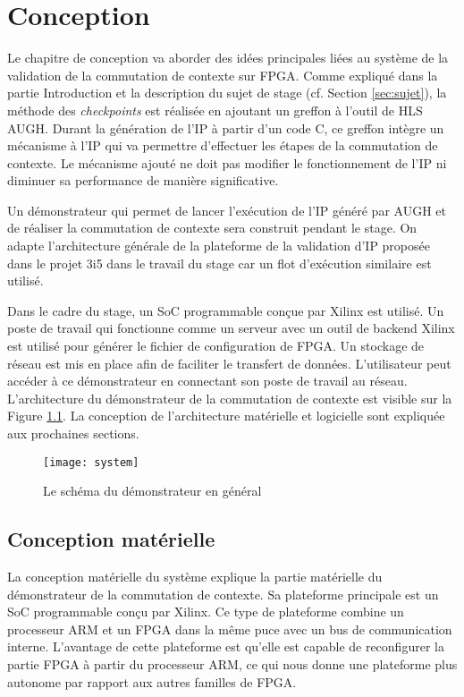\chapter{Conception}
\label{chap:concep}
\OnehalfSpacing

Le chapitre de conception va aborder des idées principales liées au système de la validation de la commutation de contexte sur FPGA.
Comme expliqué dans la partie Introduction et la description du sujet de stage 
(cf. Section \ref{sec:sujet}), la méthode des \emph{checkpoints} 
est réalisée en ajoutant un greffon à l'outil de HLS AUGH.
Durant la génération de l'IP à partir d'un code C, ce greffon intègre un mécanisme à l'IP
qui va permettre d'effectuer les étapes de la commutation de contexte. Le mécanisme
ajouté ne doit pas modifier le fonctionnement de l'IP ni diminuer sa performance de manière significative.

Un démonstrateur qui permet de lancer l'exécution de l'IP généré par AUGH et de réaliser la commutation
de contexte sera construit pendant le stage.
On adapte l'architecture générale de la plateforme de la validation d'IP
proposée dans le projet 3i5\cite{Brisebard2015, Wicaksana2015} dans le travail du stage car
un flot d'exécution similaire est utilisé. 

Dans le cadre du stage, un SoC programmable conçue par Xilinx est utilisé.
Un poste de travail qui fonctionne comme un serveur avec un outil de backend Xilinx est utilisé pour générer le fichier de configuration de FPGA. 
Un stockage de réseau est mis en place afin de faciliter le transfert de données.
L'utilisateur peut accéder à ce démonstrateur en connectant son poste de travail au réseau.
L'architecture du démonstrateur de la commutation de contexte est visible sur la Figure \ref{fig:system}.
La conception de l'architecture matérielle et logicielle sont expliquée aux prochaines sections.

\begin{figure}[h]
	\centering
	\texttt{[image: system]}
	\caption{Le schéma du démonstrateur en général}
	\label{fig:system}
	\vspace{-2mm}
\end{figure} 

\section{Conception matérielle}
\label{sec:concephard}

La conception matérielle du système explique la partie matérielle du démonstrateur de la commutation de contexte.
Sa plateforme principale est un SoC programmable conçu par Xilinx. Ce type de plateforme
combine un processeur ARM et un FPGA dans la même puce avec un bus de communication interne. L'avantage de cette plateforme
est qu'elle est capable de reconfigurer la partie FPGA à partir du processeur ARM, ce qui nous donne une plateforme plus autonome
par rapport aux autres familles de FPGA.

